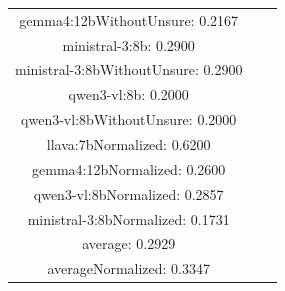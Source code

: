 \documentclass[a4paper]{article}
\begin{document}
\begin{tabular}{ccc}
gemma4:12bWithoutUnsure: 0.2167 \\ ministral-3:8b: 0.2900 \\ ministral-3:8bWithoutUnsure: 0.2900 \\ qwen3-vl:8b: 0.2000 \\ qwen3-vl:8bWithoutUnsure: 0.2000 \\ llava:7bNormalized: 0.6200 \\ gemma4:12bNormalized: 0.2600 \\ qwen3-vl:8bNormalized: 0.2857 \\ ministral-3:8bNormalized: 0.1731 \\ average: 0.2929 \\ averageNormalized: 0.3347 \end{minipage}\\
\end{tabular}

\vspace{5mm}
\end{document}
